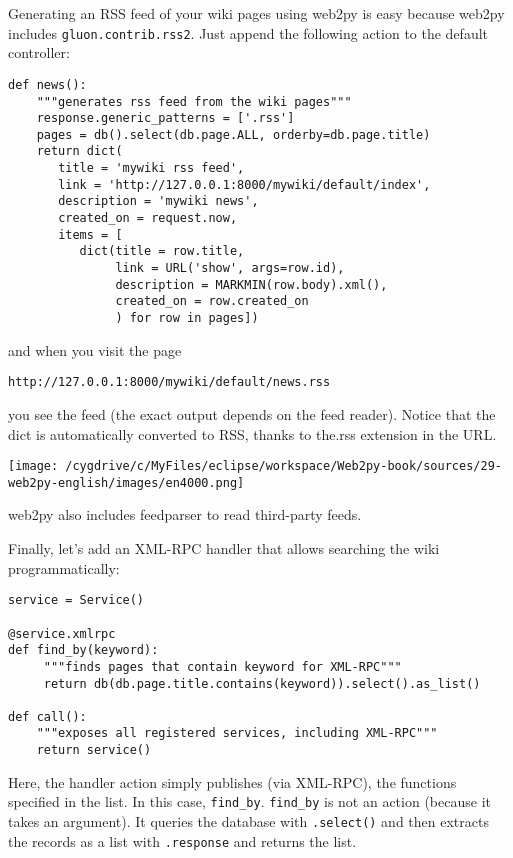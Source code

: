 \documentclass[justified,sixbynine,notoc]{tufte-book}
\def\ft{\small\tt}
\def\inxx#1{\index{#1}}
\begin{document}
\begin{fullwidth}
\inxx{rss}
Generating an RSS feed of your wiki pages using web2py is easy because web2py includes {\ft gluon.contrib.rss2}. Just append the following action to the default controller:
\begin{lstlisting}
def news():
    """generates rss feed from the wiki pages"""
    response.generic_patterns = ['.rss']
    pages = db().select(db.page.ALL, orderby=db.page.title)
    return dict(
       title = 'mywiki rss feed',
       link = 'http://127.0.0.1:8000/mywiki/default/index',
       description = 'mywiki news',
       created_on = request.now,
       items = [
          dict(title = row.title,
               link = URL('show', args=row.id),
               description = MARKMIN(row.body).xml(),
               created_on = row.created_on
               ) for row in pages])
\end{lstlisting}
\noindent and when you visit the page
\begin{lstlisting}[keywords={}]
http://127.0.0.1:8000/mywiki/default/news.rss
\end{lstlisting}
\noindent you see the feed (the exact output depends on the feed reader). Notice that the dict is automatically converted to RSS, thanks to the.rss extension in the URL.


\goodbreak\begin{center}\texttt{[image: /cygdrive/c/MyFiles/eclipse/workspace/Web2py-book/sources/29-web2py-english/images/en4000.png]}\end{center}

\noindent web2py also includes feedparser to read third-party feeds.

\inxx{XMLRPC}
Finally, let's add an XML-RPC handler that allows searching the wiki programmatically:
\begin{lstlisting}
service = Service()

@service.xmlrpc
def find_by(keyword):
     """finds pages that contain keyword for XML-RPC"""
     return db(db.page.title.contains(keyword)).select().as_list()

def call():
    """exposes all registered services, including XML-RPC"""
    return service()
\end{lstlisting}

Here, the handler action simply publishes (via XML-RPC), the functions specified in the list. In this case, {\ft find\_by}. {\ft find\_by} is not an action (because it takes an argument). It queries the database with {\ft .select()} and then extracts the records as a list with {\ft .response} and returns the list.


\end{fullwidth}
\end{document}

